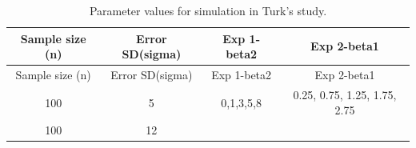 \documentclass[12pt]{article}
\begin{document}
\begin{longtable}[]{@{}cccc@{}}
\caption{Parameter values for simulation in Turk's
study.}\tabularnewline
\toprule
\begin{minipage}[b]{0.20\columnwidth}\centering\strut
Sample size (n)\strut
\end{minipage} & \begin{minipage}[b]{0.20\columnwidth}\centering\strut
Error SD(sigma)\strut
\end{minipage} & \begin{minipage}[b]{0.15\columnwidth}\centering\strut
Exp 1-beta2\strut
\end{minipage} & \begin{minipage}[b]{0.33\columnwidth}\centering\strut
Exp 2-beta1\strut
\end{minipage}\tabularnewline
\midrule
\endfirsthead
\toprule
\begin{minipage}[b]{0.20\columnwidth}\centering\strut
Sample size (n)\strut
\end{minipage} & \begin{minipage}[b]{0.20\columnwidth}\centering\strut
Error SD(sigma)\strut
\end{minipage} & \begin{minipage}[b]{0.15\columnwidth}\centering\strut
Exp 1-beta2\strut
\end{minipage} & \begin{minipage}[b]{0.33\columnwidth}\centering\strut
Exp 2-beta1\strut
\end{minipage}\tabularnewline
\midrule
\endhead
\begin{minipage}[t]{0.20\columnwidth}\centering\strut
100\strut
\end{minipage} & \begin{minipage}[t]{0.20\columnwidth}\centering\strut
5\strut
\end{minipage} & \begin{minipage}[t]{0.15\columnwidth}\centering\strut
0,1,3,5,8\strut
\end{minipage} & \begin{minipage}[t]{0.33\columnwidth}\centering\strut
0.25, 0.75, 1.25, 1.75, 2.75\strut
\end{minipage}\tabularnewline
\begin{minipage}[t]{0.20\columnwidth}\centering\strut
100\strut
\end{minipage} & \begin{minipage}[t]{0.20\columnwidth}\centering\strut
12\strut
\end{minipage} & \begin{minipage}[t]{0.15\columnwidth}\centering\strut

\end{minipage}
\end{longtable}
\end{document}
